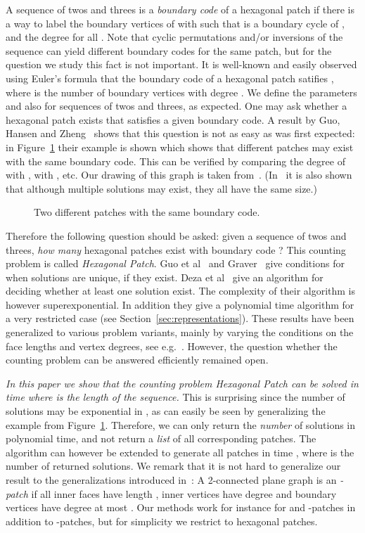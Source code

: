 \documentclass{llncs}
\begin{document}
A sequence  of twos and threes is a {\em boundary code} of a hexagonal patch  if there is a way to label the boundary vertices of  with  such that  is a boundary cycle of , and the degree  for all . Note that cyclic permutations and/or inversions of the sequence can yield different boundary codes for the same patch, but for the question we study this fact is not important.
It is well-known and easily observed using Euler's formula that the boundary code of a hexagonal patch satifies , where  is the number of boundary vertices with degree . We define the parameters  and  also for sequences  of twos and threes, as expected.
One may ask whether a hexagonal patch exists that satisfies a given boundary code.
A result by Guo, Hansen and Zheng~\cite{GHZ02} shows that this question is not as easy as was first expected: in Figure~\ref{fig:nontriv} their example is shown which shows that 
different patches may exist with the same boundary code. This can be verified by comparing the degree of  with ,  with , etc. 
Our drawing of this graph is taken from~\cite{BDN05}. (In~\cite{GHZ02} it is also shown that although multiple solutions may exist, they all have the same size.)
\begin{figure}
\centering
\scalebox{0.8}{v_1v_2u_2u_1}
\caption{Two different patches with the same boundary code.}
\label{fig:nontriv}
\end{figure}
Therefore the following question should be asked: given a sequence  of twos and threes, {\em how many} hexagonal patches exist with boundary code ? This counting problem is called {\em Hexagonal Patch}. Guo et al~\cite{GHZ02} and Graver~\cite{Gra03} give conditions for when solutions are unique, if they exist. Deza et al~\cite{DFG01} give an algorithm for deciding whether at least one solution exist. The complexity of their algorithm is however superexponential.
In addition they give a polynomial time algorithm for a very restricted case (see Section~\ref{sec:representations}).
These results have been generalized to various problem variants, mainly by varying the conditions on the face lengths and vertex degrees, see e.g.~\cite{DDS08,BC09,BDN05,BGJ09}. However, the question whether the counting problem can be answered efficiently remained open. 


\medskip

{\em In this paper we show that the counting problem Hexagonal Patch can be solved in time  where  is the length of the sequence.} This is surprising since the number of solutions may be exponential in , as can easily be seen by generalizing the example from Figure~\ref{fig:nontriv}.
Therefore, we can only return the {\em number} of solutions in polynomial time, and not return a {\em list} of all corresponding patches. The algorithm can however be extended to generate all patches in time , where  is the number of returned solutions.
We remark that it is not hard to generalize our result to the generalizations introduced in~\cite{BDN05}:
A 2-connected plane graph is an {\em -patch} if all inner faces have length , inner vertices have degree  and boundary vertices have degree at most . 
Our methods work for instance for  and -patches in addition to -patches, but for simplicity we restrict to hexagonal patches.
\end{document}
